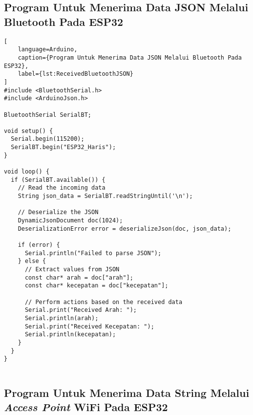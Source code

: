 \subsection{Program Untuk Menerima Data JSON Melalui Bluetooth Pada ESP32}

\begin{lstlisting}[
    language=Arduino,
    caption={Program Untuk Menerima Data JSON Melalui Bluetooth Pada ESP32},
    label={lst:ReceivedBluetoothJSON}
]
#include <BluetoothSerial.h>
#include <ArduinoJson.h>

BluetoothSerial SerialBT;

void setup() {
  Serial.begin(115200);
  SerialBT.begin("ESP32_Haris");
}

void loop() {
  if (SerialBT.available()) {
    // Read the incoming data
    String json_data = SerialBT.readStringUntil('\n');

    // Deserialize the JSON
    DynamicJsonDocument doc(1024);
    DeserializationError error = deserializeJson(doc, json_data);

    if (error) {
      Serial.println("Failed to parse JSON");
    } else {
      // Extract values from JSON
      const char* arah = doc["arah"];
      const char* kecepatan = doc["kecepatan"];

      // Perform actions based on the received data
      Serial.print("Received Arah: ");
      Serial.println(arah);
      Serial.print("Received Kecepatan: ");
      Serial.println(kecepatan);
    }
  }
}
    
\end{lstlisting}

\subsection{Program Untuk Menerima Data String Melalui \emph{Access Point} WiFi Pada ESP32}


